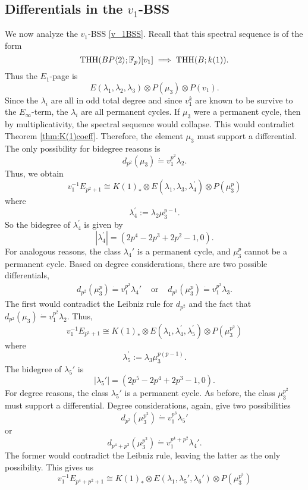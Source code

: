 \subsection{Differentials in the $v_1$-BSS}

We now analyze the $v_1$-BSS \eqref{v_1BSS}. Recall that this spectral sequence is of the form 
\[
\operatorname{THH}(BP\langle 2 \rangle;\mathbb{F}_p)[v_1]\implies \operatorname{THH}(B;k(1)).
\]
Thus the $E_1$-page is 
\begin{equation}\label{v_1bockinput}
E(\lambda_1, \lambda_2, \lambda_3)\otimes P(\mu_3)\otimes P(v_1). 
\end{equation}
Since the $\lambda_i$ are all in odd total degree and since $v_1^k$ are known to be survive to the $E_{\infty}$-term, the $\lambda_i$ are all permanent cycles. If $\mu_3$ were a permanent cycle, then by multiplicativity, the spectral sequence would collapse. This would contradict Theorem \ref{thm:K(1)coeff}. Therefore, the element $\mu_3$ must support a differential. The only possibility for bidegree reasons is
\[
d_{p^2}(\mu_3)\dot{=}v_1^{p^2}\lambda_2.
\]
Thus, we obtain 
\[
v_1^{-1}E_{p^2+1}\cong K(1)_*\otimes E(\lambda_1, \lambda_3,\lambda_4^{\prime})\otimes P(\mu_3^p)
\]
where 
\[
\lambda_4^{\prime}:= \lambda_2\mu_3^{p-1}.
\]
So the bidegree of $\lambda_4^{\prime}$ is given by 
\[
|\lambda_4^{\prime}|= (2p^4-2p^3+2p^2-1,0).
\]
For analogous reasons, the class $\lambda_4'$ is a permanent cycle, and $\mu_3^p$ cannot be a permanent cycle. Based on degree considerations, there are two possible differentials, 
\[
\begin{array}{ccc}
d_{p^2}(\mu_3^p)\dot{=} v_1^{p^2}\lambda_4' &\text{ or } &d_{p^3}(\mu_3^p)\dot{=}v_1^{p^3}\lambda_3.
\end{array}
\]
The first would contradict the Leibniz rule for $d_{p^2}$ and the fact that $d_{p^2}(\mu_3)\dot{=}v_1^{p^2}\lambda_2$. Thus, 
\[
v_1^{-1}E_{p^3+1}\cong K(1)_*\otimes E(\lambda_1, \lambda_4^{\prime}, \lambda_5^{\prime})\otimes P(\mu_3^{p^2})
\]
where
\[
\lambda_5^{\prime}:= \lambda_3\mu_3^{p(p-1)} .
\]
The bidegree of $\lambda_5'$ is 
\[
|\lambda_5'|=(2p^5-2p^4+2p^3-1,0).
\]
For degree reasons, the class $\lambda_5'$ is a permanent cycle. As before, the class $\mu_3^{p^2}$ must support a differential. Degree considerations, again, give two possibilities
\[
d_{p^3}(\mu_3^{p^2})\dot{=}v_1^{p^3}\lambda_5'
\]
or 
\[
d_{p^4+p^2}(\mu_3^{p^2}) \dot{=} v_1^{p^4+p^2}\lambda_4'.
\]
The former would contradict the Leibniz rule, leaving the latter as the only possibility. This gives us
\[
v_1^{-1}E_{p^4+p^2+1}\cong K(1)_*\otimes E(\lambda_1, \lambda_5', \lambda_6')\otimes P(\mu_3^{p^3})
\]
